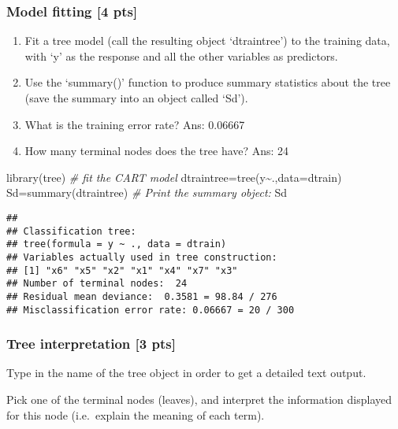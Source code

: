 \documentclass[
]{article}
\newenvironment{Shaded}{\begin{snugshade}}{\end{snugshade}}
\newcommand{\AttributeTok}[1]{\textcolor[rgb]{0.77,0.63,0.00}{#1}}
\newcommand{\CommentTok}[1]{\textcolor[rgb]{0.56,0.35,0.01}{\textit{#1}}}
\newcommand{\FunctionTok}[1]{\textcolor[rgb]{0.00,0.00,0.00}{#1}}
\newcommand{\NormalTok}[1]{#1}
\newcommand{\OtherTok}[1]{\textcolor[rgb]{0.56,0.35,0.01}{#1}}
\newcommand{\SpecialCharTok}[1]{\textcolor[rgb]{0.00,0.00,0.00}{#1}}
\begin{document}
\hypertarget{model-fitting-4-pts}{%
\subsubsection{Model fitting {[}4 pts{]}}\label{model-fitting-4-pts}}

\begin{enumerate}
\def\labelenumi{\arabic{enumi}.}
\item
  Fit a tree model (call the resulting object `dtraintree') to the
  training data, with `y' as the response and all the other variables as
  predictors.
\item
  Use the `summary()' function to produce summary statistics about the
  tree (save the summary into an object called `Sd').
\item
  What is the training error rate? Ans: 0.06667
\item
  How many terminal nodes does the tree have? Ans: 24
\end{enumerate}

\begin{Shaded}
\begin{Highlighting}[]
\FunctionTok{library}\NormalTok{(tree)}
\CommentTok{\# fit the CART model}
\NormalTok{dtraintree}\OtherTok{=}\FunctionTok{tree}\NormalTok{(y}\SpecialCharTok{\textasciitilde{}}\NormalTok{.,}\AttributeTok{data=}\NormalTok{dtrain)}
\NormalTok{Sd}\OtherTok{=}\FunctionTok{summary}\NormalTok{(dtraintree)}
\CommentTok{\# Print the summary object:}
\NormalTok{Sd}
\end{Highlighting}
\end{Shaded}

\begin{verbatim}
## 
## Classification tree:
## tree(formula = y ~ ., data = dtrain)
## Variables actually used in tree construction:
## [1] "x6" "x5" "x2" "x1" "x4" "x7" "x3"
## Number of terminal nodes:  24 
## Residual mean deviance:  0.3581 = 98.84 / 276 
## Misclassification error rate: 0.06667 = 20 / 300
\end{verbatim}

\hypertarget{tree-interpretation-3-pts}{%
\subsubsection{Tree interpretation {[}3
pts{]}}\label{tree-interpretation-3-pts}}

Type in the name of the tree object in order to get a detailed text
output.

Pick one of the terminal nodes (leaves), and interpret the information
displayed for this node (i.e.~explain the meaning of each term).
\end{document}
